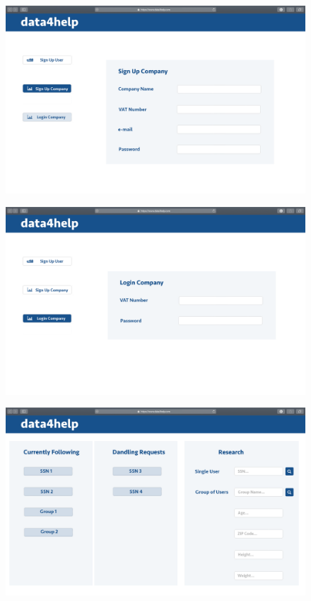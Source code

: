 \documentclass{article}
\begin{document}
\begin{figure}[h!]
\centering
    \textbf{}\par\medskip
	\includegraphics[width= \linewidth]{3signupcompany.png}
\end{figure}
\begin{figure}[h!]
\centering
    \textbf{}\par\medskip
	\includegraphics[width= \linewidth]{4logincompany.png}
\end{figure}\newpage
\begin{figure}[h!]
\centering
    \textbf{}\par\medskip
	\includegraphics[width= \linewidth]{5companyhompage.png}
\end{figure}
\end{document}
